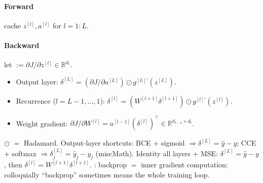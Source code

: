 \paragraph{Forward} cache $z^{[l]},a^{[l]}$ for $l{=}1{:}L$.
\paragraph{Backward} let  $:=\partial J/\partial z^{[l]}\!\in\!\mathbb{R}^{d_l}$.
\begin{itemize}
\item Output layer: $\delta^{[L]}{=}(\partial J/\partial a^{[L]})\odot g^{[L]\prime}(z^{[L]})$.
\item Recurrence ($l{=}L{-}1,\ldots,1$): $\delta^{[l]}{=}(W^{[l+1]}\delta^{[l+1]})\odot g^{[l]\prime}(z^{[l]})$.
\item Weight gradient: $\partial J/\partial W^{[l]}{=}a^{[l-1]}(\delta^{[l]})^{\top}\!\in\!\mathbb{R}^{d_{l-1}\times d_l}$.
\end{itemize}
$\odot$ $=$ Hadamard. Output-layer shortcuts: BCE $+$ sigmoid $\Rightarrow\delta^{[L]}{=}\hat y{-}y$; CCE $+$ softmax $\Rightarrow\delta^{[L]}_j{=}\hat y_j{-}y_j$ (miscMath). Identity all layers $+$ MSE: $\delta^{[L]}{=}\hat y{-}y$, then $\delta^{[l]}{=}W^{[l+1]}\delta^{[l+1]}$.
: backprop $=$ inner gradient computation; colloquially ``backprop'' sometimes means the whole training loop.
